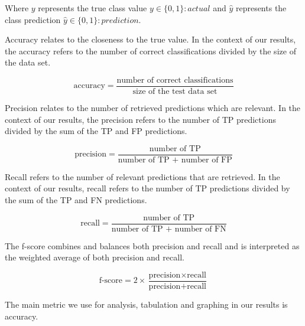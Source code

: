 Where $y$ represents the true class value $y \in \{0,1\} : actual$ and $\hat{y}$ represents the class prediction $\hat{y} \in \{0,1\} : prediction$.

Accuracy relates to the closeness to the true value. In the context of our results, the accuracy refers to the number of correct classifications 
divided by the size of the data set.

\[ \text{accuracy} = \frac{\text{number of correct classifications}}{\text{size of the test data set}}\]

Precision relates to the number of retrieved predictions which are relevant. In the context of our results, the precision refers to the number of TP predictions 
divided by the sum of the TP and FP predictions.

\[ \text{precision} = \frac{\text{number of TP}}{\text{number of TP + number of FP}}\]

Recall refers to the number of relevant predictions that are retrieved. In the context of our results, recall refers to the number of TP predictions 
divided by the sum of the TP and FN predictions.

\[ \text{recall} = \frac{\text{number of TP}}{\text{number of TP + number of FN}}\]

The f-score combines and balances both precision and recall and is interpreted as the weighted average of both precision and recall. 

\[ \text{f-score} = 2 \times \frac{\text{precision} \times \text{recall}}{\text{precision} + \text{recall}}\]

The main metric we use for analysis, tabulation and graphing in our results is accuracy.

